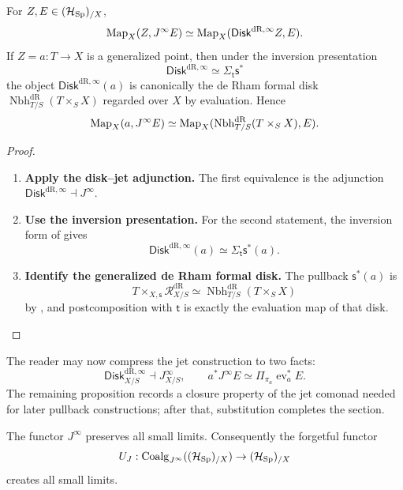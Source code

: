 \begin{proposition}
\label{prop:maps-from-formal-disks}
For \(Z,E\in(\mathcal H_{\operatorname{Sp}})_{/X}\),
\[
  \operatorname{Map}_X(Z,J^\infty E)
  \simeq
  \operatorname{Map}_X(\mathsf{Disk}^{\mathrm{dR},\infty} Z,E).
\]
If \(Z=a:T\to X\) is a generalized point, then under the inversion presentation
\[
  \mathsf{Disk}^{\mathrm{dR},\infty}\simeq\Sigma_{\mathsf t}\mathsf s^*
\]
the object \(\mathsf{Disk}^{\mathrm{dR},\infty}(a)\) is canonically the de Rham formal disk
\(\operatorname{Nbh}^{\mathrm{dR}}_{T/S}(T\times_SX)\) regarded over \(X\) by evaluation. Hence
\[
  \operatorname{Map}_X(a,J^\infty E)
  \simeq
  \operatorname{Map}_X(\operatorname{Nbh}^{\mathrm{dR}}_{T/S}(T\times_SX),E).
\]
\end{proposition}

\begin{proof}
\leavevmode
\begin{enumerate}[label=\textup{(\arabic*)}]
    \item \textbf{Apply the disk--jet adjunction.}
The first equivalence is the adjunction \(\mathsf{Disk}^{\mathrm{dR},\infty}\dashv J^\infty\).

    \item \textbf{Use the inversion presentation.}
For the
second statement, the inversion form of
 gives
\[
  \mathsf{Disk}^{\mathrm{dR},\infty}(a)
  \simeq
  \Sigma_{\mathsf t}\mathsf s^*(a).
\]

    \item \textbf{Identify the generalized de Rham formal disk.}
The pullback \(\mathsf s^*(a)\) is
\[
  T\times_{X,\mathsf s}\mathcal R^{\mathrm{dR}}_{X/S}
  \simeq
  \operatorname{Nbh}^{\mathrm{dR}}_{T/S}(T\times_SX)
\]
by , and postcomposition with \(\mathsf t\) is exactly
the evaluation map of that disk.
\end{enumerate}
\end{proof}

The reader may now compress the jet construction to two facts:
\[
  \mathsf{Disk}^{\mathrm{dR},\infty}_{X/S}
  \dashv
  J^\infty_{X/S},
  \qquad
  a^*J^\infty E
  \simeq
  \Pi_{\pi_a}\operatorname{ev}_a^*E.
\]
The remaining proposition records a closure property of the jet comonad needed
for later pullback constructions; after that, substitution completes the
section.

\begin{proposition}
\label{prop:jet-limits}
The functor \(J^\infty\) preserves all small limits. Consequently the
forgetful functor
\[
  U_J:\operatorname{Coalg}_{J^\infty}((\mathcal H_{\operatorname{Sp}})_{/X})\to(\mathcal H_{\operatorname{Sp}})_{/X}
\]
creates all small limits.
\end{proposition}

